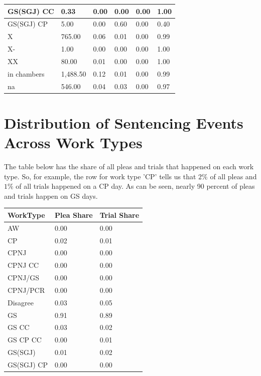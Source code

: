 \documentclass[11pt]{article}
\begin{document}
\begin{table}[H]
\begin{tabular}{|l|l|l|l|l|l|}
    GS(SGJ) CC  & 0.33     & 0.00 & 0.00 & 0.00 & 1.00 \\ \hline
    GS(SGJ) CP  & 5.00     & 0.00 & 0.60 & 0.00 & 0.40 \\ \hline
    X           & 765.00   & 0.06 & 0.01 & 0.00 & 0.99 \\ \hline
    X-          & 1.00     & 0.00 & 0.00 & 0.00 & 1.00 \\ \hline
    XX          & 80.00    & 0.01 & 0.00 & 0.00 & 1.00 \\ \hline
    in chambers & 1,488.50 & 0.12 & 0.01 & 0.00 & 0.99 \\ \hline
    na          & 546.00   & 0.04 & 0.03 & 0.00 & 0.97 \\ \hline
    \end{tabular}
  \end{table}

\section{Distribution of Sentencing Events Across Work Types}
  The table below has the share of all pleas and trials that happened on each work type.
  So, for example, the row for work type 'CP' tells us that $2\%$ of all pleas and $1\%$ of
  all trials happened on a CP day. As can be seen, nearly 90 percent of pleas and trials happen
  on GS days.
  \begin{table}[H]
    \centering
    \begin{tabular}{|l|l|l|}
    \hline
    \textbf{WorkType} & \textbf{Plea Share} & \textbf{Trial Share} \\ \hline
    AW                & 0.00                & 0.00                 \\ \hline
    CP                & 0.02                & 0.01                 \\ \hline
    CPNJ              & 0.00                & 0.00                 \\ \hline
    CPNJ CC           & 0.00                & 0.00                 \\ \hline
    CPNJ/GS           & 0.00                & 0.00                 \\ \hline
    CPNJ/PCR          & 0.00                & 0.00                 \\ \hline
    Disagree          & 0.03                & 0.05                 \\ \hline
    GS                & 0.91                & 0.89                 \\ \hline
    GS CC             & 0.03                & 0.02                 \\ \hline
    GS CP CC          & 0.00                & 0.01                 \\ \hline
    GS(SGJ)           & 0.01                & 0.02                 \\ \hline
    GS(SGJ) CP        & 0.00                & 0.00                 \\ \hline
    \end{tabular}
  \end{table}
\end{document}
